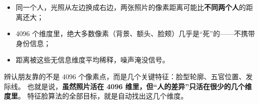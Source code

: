 \begin{itemize}
  \item 同一个人，光照从左边换成右边，两张照片的像素距离可能比\textbf{不同两个人}的距离还大；
  \item 4096 个维度里，绝大多数像素（背景、额头、脸颊）几乎是“死”的——不携带身份信息；
  \item 距离被这些无信息维度平均稀释，噪声淹没信号。
\end{itemize}

\begin{intuition}
辨认朋友靠的不是 4096 个像素点，而是几个关键特征：脸型轮廓、五官位置、发际线。
也就是说，\textbf{虽然照片活在 4096 维里，但“人的差异”只活在很少的几个维度里}。
特征脸算法的全部目标，就是自动找出这几个维度。
\end{intuition}
